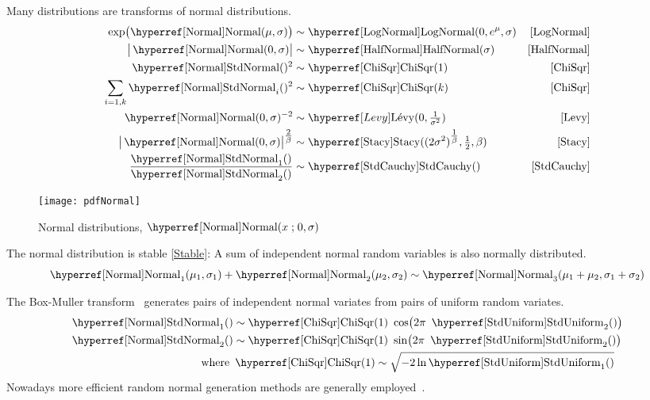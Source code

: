 Many distributions are transforms of normal distributions.
\begin{align*}
\exp\bigl(\opr{Normal}(\mu,\sigma) \bigr) &\sim \opr{LogNormal}(0, e^\mu, \sigma) & \eqref{LogNormal}  \checked
\\
\big| \opr{Normal}(0,\sigma) \big|  & \sim  \opr{HalfNormal}( \sigma) & \eqref{HalfNormal} \checked
\\
\oprr{StdNormal}{Normal}()^{2} & \sim \opr{ChiSqr}(1)  & \eqref{ChiSqr}  \checked
\\
\sum_{i=1,k}\oprr{StdNormal}{Normal}_i()^{2} & \sim \opr{ChiSqr}(k)  & \eqref{ChiSqr} \checked
\\
\opr{Normal}(0,\sigma)^{-2} & \sim \Levy( 0, \tfrac{1}{\sigma^2})   & \eqref{Levy}  \checked
\\
\big|\opr{Normal}(0,\sigma)\big|^{\tfrac{2}{\beta}} & \sim \opr{Stacy}( (2\sigma^2)^{\tfrac{1}{\beta}}, \tfrac{1}{2}, \beta )  & \eqref{Stacy}  
\\
\frac{\oprr{StdNormal}{Normal}_1()}{\oprr{StdNormal}{Normal}_2()}  & \sim  \opr{StdCauchy}() &\eqref{StdCauchy} \checked
\end{align*}



\begin{figure}[t]
\begin{center}
\texttt{[image: pdfNormal]}
\end{center}
\caption[Normal distributions]{Normal distributions, $\opr{Normal}(x\given 0,\sigma)$}
\end{figure}


The normal distribution is stable \eqref{Stable}: A sum of independent normal random variables is also normally distributed.
\[
 \opr{Normal}_1(\mu_1,\sigma_1) +  \opr{Normal}_2(\mu_2,\sigma_2) \sim  \opr{Normal}_3(\mu_1+\mu_2,\sigma_1+\sigma_2)
\checked
\notag
\]

The Box-Muller transform~\cite{Box1958} generates pairs of independent normal variates from pairs of uniform random variates.
\begin{align*}
\oprr{StdNormal}{Normal}_1() & \sim \opr{ChiSqr}(1)\ \cos\bigl( 2\pi\ \opr{StdUniform}_2() \bigr) \checked
\\
\oprr{StdNormal}{Normal}_2() & \sim \opr{ChiSqr}(1)\ \sin\bigl( 2\pi\ \opr{StdUniform}_2() \bigr) \checked
\\
\text{where }& \opr{ChiSqr}(1) \sim\sqrt{ - 2 \ln \opr{StdUniform}_1()}  \checked
\end{align*}
Nowadays more efficient random normal generation methods are generally employed~.






